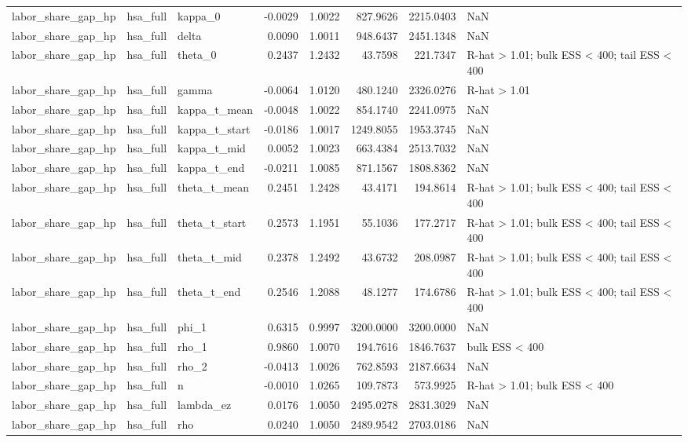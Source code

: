 \begin{tabular}{lllrrrrl}
labor\_share\_gap\_hp & hsa\_full & kappa\_0 & -0.0029 & 1.0022 & 827.9626 & 2215.0403 & NaN \\
labor\_share\_gap\_hp & hsa\_full & delta & 0.0090 & 1.0011 & 948.6437 & 2451.1348 & NaN \\
labor\_share\_gap\_hp & hsa\_full & theta\_0 & 0.2437 & 1.2432 & 43.7598 & 221.7347 & R-hat > 1.01; bulk ESS < 400; tail ESS < 400 \\
labor\_share\_gap\_hp & hsa\_full & gamma & -0.0064 & 1.0120 & 480.1240 & 2326.0276 & R-hat > 1.01 \\
labor\_share\_gap\_hp & hsa\_full & kappa\_t\_mean & -0.0048 & 1.0022 & 854.1740 & 2241.0975 & NaN \\
labor\_share\_gap\_hp & hsa\_full & kappa\_t\_start & -0.0186 & 1.0017 & 1249.8055 & 1953.3745 & NaN \\
labor\_share\_gap\_hp & hsa\_full & kappa\_t\_mid & 0.0052 & 1.0023 & 663.4384 & 2513.7032 & NaN \\
labor\_share\_gap\_hp & hsa\_full & kappa\_t\_end & -0.0211 & 1.0085 & 871.1567 & 1808.8362 & NaN \\
labor\_share\_gap\_hp & hsa\_full & theta\_t\_mean & 0.2451 & 1.2428 & 43.4171 & 194.8614 & R-hat > 1.01; bulk ESS < 400; tail ESS < 400 \\
labor\_share\_gap\_hp & hsa\_full & theta\_t\_start & 0.2573 & 1.1951 & 55.1036 & 177.2717 & R-hat > 1.01; bulk ESS < 400; tail ESS < 400 \\
labor\_share\_gap\_hp & hsa\_full & theta\_t\_mid & 0.2378 & 1.2492 & 43.6732 & 208.0987 & R-hat > 1.01; bulk ESS < 400; tail ESS < 400 \\
labor\_share\_gap\_hp & hsa\_full & theta\_t\_end & 0.2546 & 1.2088 & 48.1277 & 174.6786 & R-hat > 1.01; bulk ESS < 400; tail ESS < 400 \\
labor\_share\_gap\_hp & hsa\_full & phi\_1 & 0.6315 & 0.9997 & 3200.0000 & 3200.0000 & NaN \\
labor\_share\_gap\_hp & hsa\_full & rho\_1 & 0.9860 & 1.0070 & 194.7616 & 1846.7637 & bulk ESS < 400 \\
labor\_share\_gap\_hp & hsa\_full & rho\_2 & -0.0413 & 1.0026 & 762.8593 & 2187.6634 & NaN \\
labor\_share\_gap\_hp & hsa\_full & n & -0.0010 & 1.0265 & 109.7873 & 573.9925 & R-hat > 1.01; bulk ESS < 400 \\
labor\_share\_gap\_hp & hsa\_full & lambda\_ez & 0.0176 & 1.0050 & 2495.0278 & 2831.3029 & NaN \\
labor\_share\_gap\_hp & hsa\_full & rho & 0.0240 & 1.0050 & 2489.9542 & 2703.0186 & NaN \\

\end{tabular}
